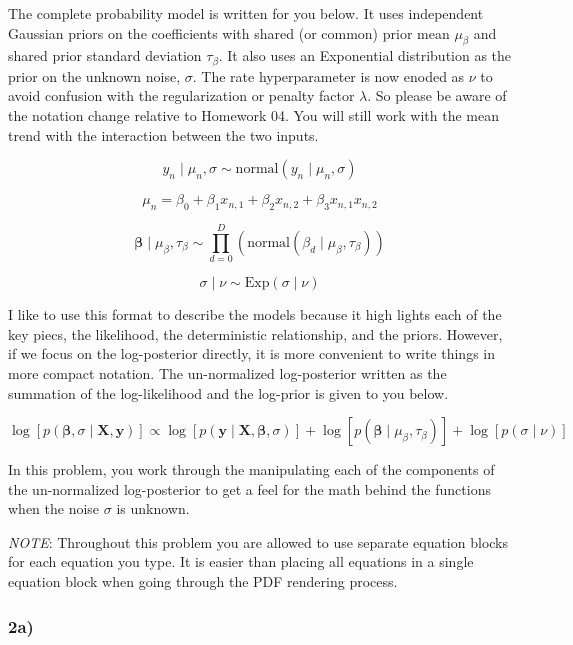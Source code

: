 \documentclass[
]{article}
\begin{document}
The complete probability model is written for you below. It uses
independent Gaussian priors on the coefficients with shared (or common)
prior mean \(\mu_{\beta}\) and shared prior standard deviation
\(\tau_{\beta}\). It also uses an Exponential distribution as the prior
on the unknown noise, \(\sigma\). The rate hyperparameter is now enoded
as \(\nu\) to avoid confusion with the regularization or penalty factor
\(\lambda\). So please be aware of the notation change relative to
Homework 04. You will still work with the mean trend with the
interaction between the two inputs.

\[ 
y_n \mid \mu_n, \sigma \sim \mathrm{normal}\left(y_n \mid \mu_n, \sigma \right)
\]

\[ 
\mu_n = \beta_0 + \beta_1 x_{n,1} + \beta_2 x_{n,2} + \beta_3 x_{n,1} x_{n,2}
\]

\[
\boldsymbol{\beta} \mid \mu_{\beta}, \tau_{\beta} \sim \prod_{d=0}^{D} \left( \mathrm{normal} \left( \beta_d \mid \mu_{\beta}, \tau_{\beta} \right) \right)
\]

\[ 
\sigma \mid \nu \sim \mathrm{Exp} \left( \sigma \mid \nu \right)
\]

I like to use this format to describe the models because it high lights
each of the key piecs, the likelihood, the deterministic relationship,
and the priors. However, if we focus on the log-posterior directly, it
is more convenient to write things in more compact notation. The
un-normalized log-posterior written as the summation of the
log-likelihood and the log-prior is given to you below.

\[ 
\log\left[ p \left( \boldsymbol{\beta}, \sigma \mid \mathbf{X},\mathbf{y} \right) \right] \propto \log\left[p\left(\mathbf{y} \mid \mathbf{X},\boldsymbol{\beta},\sigma\right)\right] +\log\left[p\left(\boldsymbol{\beta} \mid \mu_{\beta},\tau_{\beta}\right)\right] +\log\left[p\left(\sigma \mid \nu \right)\right]
\]

In this problem, you work through the manipulating each of the
components of the un-normalized log-posterior to get a feel for the math
behind the functions when the noise \(\sigma\) is unknown.

\emph{NOTE}: Throughout this problem you are allowed to use separate
equation blocks for each equation you type. It is easier than placing
all equations in a single equation block when going through the PDF
rendering process.

\hypertarget{a-1}{%
\subsubsection{2a)}\label{a-1}}
\end{document}
